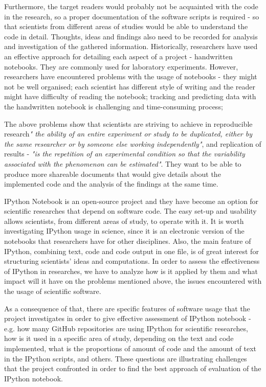 Furthermore, the target readers would probably not be acquainted with the code in the research, so a proper documentation of the software scripts is required - so that scientists from different areas of studies would be able to understand the code in detail. Thoughts, ideas and findings also need to be recorded for analysis and investigation of the gathered information. Historically, researchers have used an effective approach for detailing each aspect of a project - handwritten notebooks.\cite{holmes2003reworking} They are commonly used for laboratory experiments. However, researchers have encountered problems with the usage of notebooks - they might not be well organised; each scientist has different style of writing and the reader might have difficulty of reading the notebook; tracking and predicting data with the handwritten notebook is challenging and time-consuming process;

The above problems show that scientists are striving to achieve in reproducible research\textit{" the ability of an entire experiment or study to be duplicated, either by the same researcher or by someone else working independently"}, and replication of results - \textit{"is the repetition of an experimental condition so that the variability associated with the phenomenon can be estimated"}. \cite{reproducibilityWiki} \cite{replicationWiki} They want to be able to produce more shareable documents that would give details about the implemented code and the analysis of the findings at the same time. 

IPython Notebook is an open-source project and they have become an option for scientific researches that depend on software code. The easy set-up and usability allows scientists, from different areas of study, to operate with it. It is worth investigating IPython usage in science, since it is an electronic version of the notebooks that researchers have for other disciplines. Also, the main feature of IPython, combining text, code and code output in one file, is of great interest for structuring scientists' ideas and computations. In order to assess the effectiveness of IPython in researches, we have to analyze how is it applied by them and what impact will it have on the problems mentioned above, the issues encountered with the usage of scientific software. 

As a consequence of that, there are specific features of software usage that the project investigates in order to give effective assessment of IPython notebook - e.g. how many GitHub repositories are using IPython for scientific researches, how is it used in a specific area of study, depending on the text and code implemented, what is the proportions of amount of code and the amount of text in the IPython scripts, and others. These questions are illustrating challenges that the project confronted in order to find the best approach of evaluation of the IPython notebook.  


